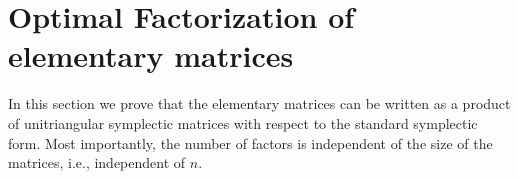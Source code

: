 \documentclass[10pt]{amsart}
\theoremstyle{remark}
\begin{document}



\section{Optimal Factorization of elementary matrices}
In this section we prove that the elementary matrices can be written as a product of unitriangular symplectic matrices with respect to the standard symplectic form. Most importantly, the number of factors is independent of the size of the matrices, i.e., independent of $n$. 
\end{document}
